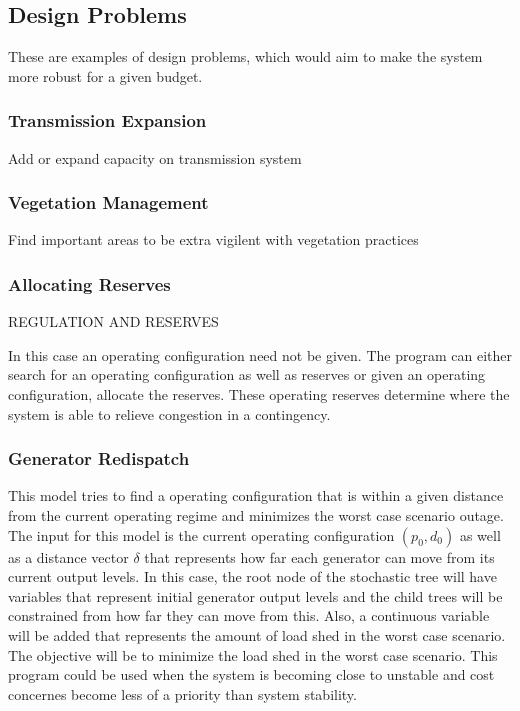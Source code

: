 \subsection{Design Problems}
These are examples of design problems, which would aim to make the system more robust for a given budget.

\subsubsection{Transmission Expansion}
Add or expand capacity on transmission system

\subsubsection{Vegetation Management}
Find important areas to be extra vigilent with vegetation practices
\cite{qi_2013}

\subsubsection{Allocating Reserves}

REGULATION AND RESERVES

In this case an operating configuration need not be given.  The program can either search for an operating configuration as well as reserves or given an operating configuration, allocate the reserves.  These operating reserves determine where the system is able to relieve congestion in a contingency.

\subsubsection{Generator Redispatch}
This model tries to find a operating configuration that is within a given distance from the current operating regime and minimizes the worst case scenario outage.  The input for this model is the current operating configuration $(p_0, d_0)$ as well as a distance vector $\delta$ that represents how far each generator can move from its current output levels.  In this case, the root node of the stochastic tree will have variables that represent initial generator output levels and the child trees will be constrained from how far they can move from this.  Also, a continuous variable will be added that represents the amount of load shed in the worst case scenario.  The objective will be to minimize the load shed in the worst case scenario.  
This program could be used when the system is becoming close to unstable and cost concernes become less of a priority than system stability.

